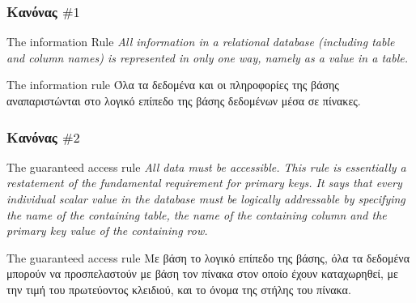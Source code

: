 \begin{frame}[t,fragile]
\frametitle{Κανόνας $\# 1$ }
\begin{minipage}{\wE}
  \en
  \begin{bclogo} [couleur=colBC, logo=\bccrayon, arrondi=0.1, couleurBord=red!80!blue, barre=none] {The information Rule}
    \em
      All information in a relational database (including table and column names) is represented in only one way, namely as a value in a table.
  \end{bclogo}
  \el
  \begin{block}{\en The information rule}
     Όλα τα δεδομένα και οι πληροφορίες της βάσης αναπαριστώνται
     στο λογικό επίπεδο της βάσης δεδομένων μέσα σε πίνακες.
  \end{block}
\end{minipage}
\end{frame}



\begin{frame}[t,fragile]
\frametitle{Κανόνας $\# 2$ }
\begin{minipage}{\wE}
  \en
  \begin{bclogo} [couleur=colBC, logo=\bccrayon, arrondi=0.1, couleurBord=red!80!blue, barre=none] {The guaranteed access rule}
    \em
      All data must be accessible. 
      This rule is essentially a restatement of the fundamental requirement for primary keys. 
      It says that every individual scalar value in the database must be logically addressable 
      by specifying the name of the containing table, the name of the containing column 
      and the primary key value of the containing row.
  \end{bclogo}
  \el
  \begin{block}{\en The guaranteed access rule}
     Με βάση το λογικό επίπεδο της βάσης, όλα τα δεδομένα μπορούν
     να προσπελαστούν με βάση τον πίνακα στον οποίο έχουν καταχωρηθεί,
     με την τιμή του πρωτεύοντος κλειδιού, και το όνομα της στήλης του πίνακα.
  \end{block}
\end{minipage}
\end{frame}



